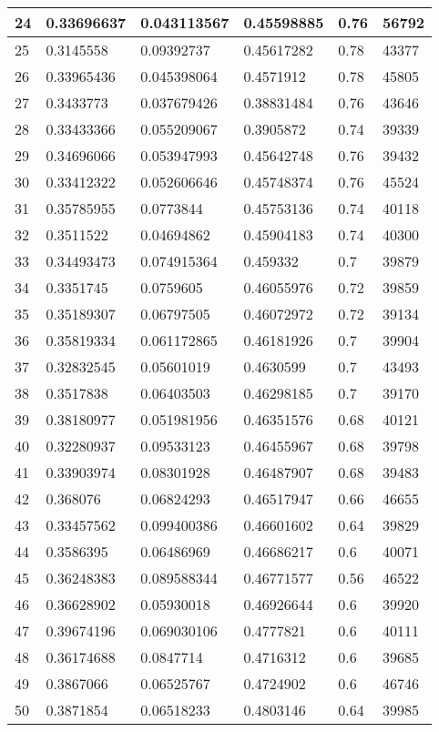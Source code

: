 \begin{longtable}{|l|l|l|l|l|l|}
24 & 0.33696637 & 0.043113567 & 0.45598885 & 0.76 & 56792 \\ \hline 
25 & 0.3145558 & 0.09392737 & 0.45617282 & 0.78 & 43377 \\ \hline 
26 & 0.33965436 & 0.045398064 & 0.4571912 & 0.78 & 45805 \\ \hline 
27 & 0.3433773 & 0.037679426 & 0.38831484 & 0.76 & 43646 \\ \hline 
28 & 0.33433366 & 0.055209067 & 0.3905872 & 0.74 & 39339 \\ \hline 
29 & 0.34696066 & 0.053947993 & 0.45642748 & 0.76 & 39432 \\ \hline 
30 & 0.33412322 & 0.052606646 & 0.45748374 & 0.76 & 45524 \\ \hline 
31 & 0.35785955 & 0.0773844 & 0.45753136 & 0.74 & 40118 \\ \hline 
32 & 0.3511522 & 0.04694862 & 0.45904183 & 0.74 & 40300 \\ \hline 
33 & 0.34493473 & 0.074915364 & 0.459332 & 0.7 & 39879 \\ \hline 
34 & 0.3351745 & 0.0759605 & 0.46055976 & 0.72 & 39859 \\ \hline 
35 & 0.35189307 & 0.06797505 & 0.46072972 & 0.72 & 39134 \\ \hline 
36 & 0.35819334 & 0.061172865 & 0.46181926 & 0.7 & 39904 \\ \hline 
37 & 0.32832545 & 0.05601019 & 0.4630599 & 0.7 & 43493 \\ \hline 
38 & 0.3517838 & 0.06403503 & 0.46298185 & 0.7 & 39170 \\ \hline 
39 & 0.38180977 & 0.051981956 & 0.46351576 & 0.68 & 40121 \\ \hline 
40 & 0.32280937 & 0.09533123 & 0.46455967 & 0.68 & 39798 \\ \hline 
41 & 0.33903974 & 0.08301928 & 0.46487907 & 0.68 & 39483 \\ \hline 
42 & 0.368076 & 0.06824293 & 0.46517947 & 0.66 & 46655 \\ \hline 
43 & 0.33457562 & 0.099400386 & 0.46601602 & 0.64 & 39829 \\ \hline 
44 & 0.3586395 & 0.06486969 & 0.46686217 & 0.6 & 40071 \\ \hline 
45 & 0.36248383 & 0.089588344 & 0.46771577 & 0.56 & 46522 \\ \hline 
46 & 0.36628902 & 0.05930018 & 0.46926644 & 0.6 & 39920 \\ \hline 
47 & 0.39674196 & 0.069030106 & 0.4777821 & 0.6 & 40111 \\ \hline 
48 & 0.36174688 & 0.0847714 & 0.4716312 & 0.6 & 39685 \\ \hline 
49 & 0.3867066 & 0.06525767 & 0.4724902 & 0.6 & 46746 \\ \hline 
50 & 0.3871854 & 0.06518233 & 0.4803146 & 0.64 & 39985 \\ \hline 
\end{longtable}